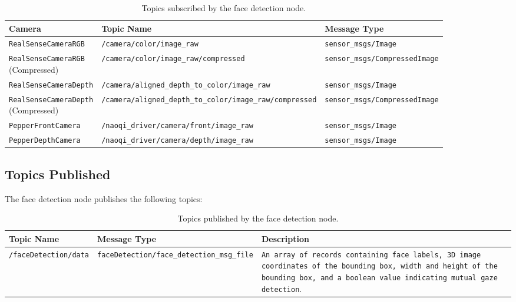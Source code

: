 \documentclass{CSSRforAfrica}
\begin{document}
{\begin{table}[!h]
	\centering
	{\fontsize{7.0}{9.0}\selectfont %
		\begin{tabularx}{\linewidth}{| l | l | X |}
			\hline
			\rowcolor{blue!20}
			\textbf{Camera} & \textbf{Topic Name} & \textbf{Message Type} \\
			\hline
			\texttt{RealSenseCameraRGB} & \texttt{/camera/color/image\_raw} & \texttt{sensor\_msgs/Image} \\
			\hline
			\makecell[l]{\texttt{RealSenseCameraRGB} \\ (Compressed)} & \texttt{/camera/color/image\_raw/compressed} & \texttt{sensor\_msgs/CompressedImage} \\
			\hline
			\texttt{RealSenseCameraDepth} & \texttt{/camera/aligned\_depth\_to\_color/image\_raw} & \texttt{sensor\_msgs/Image} \\
			\hline
			\makecell[l]{\texttt{RealSenseCameraDepth} \\ (Compressed)} & \texttt{/camera/aligned\_depth\_to\_color/image\_raw/compressed} & \texttt{sensor\_msgs/CompressedImage} \\
			\hline
			\texttt{PepperFrontCamera} & \texttt{/naoqi\_driver/camera/front/image\_raw} & \texttt{sensor\_msgs/Image} \\
			\hline
			\texttt{PepperDepthCamera} & \texttt{/naoqi\_driver/camera/depth/image\_raw} & \texttt{sensor\_msgs/Image} \\
			\hline
		\end{tabularx}
	}
	\caption{Topics subscribed by the face detection node.}
\end{table}

\subsection*{Topics Published}
The face detection node publishes the following topics:

\begin{table}[!h]
	\centering
	{\fontsize{8.5}{9.5}\selectfont
		\begin{tabularx}{\linewidth}{| l | l | X |}
			\hline
			\rowcolor{blue!20} %
			\textbf{Topic Name} & \textbf{Message Type} & \textbf{Description} \\
			\hline
			\texttt{/faceDetection/data}  & \texttt{faceDetection/face\_detection\_msg\_file} & \texttt{An array of records containing face labels, 3D image coordinates of the bounding box, width and height of the bounding box, and a boolean value indicating mutual gaze detection}. \\
			\hline
		\end{tabularx}
	}
	\caption{Topics published by the face detection node.}
\end{table}


}
\end{document}
